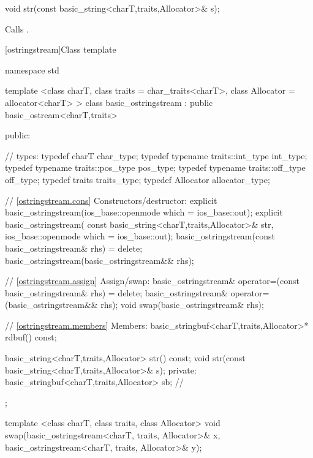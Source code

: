 %
%
\begin{itemdecl}
void str(const basic_string<charT,traits,Allocator>& s);
\end{itemdecl}

\begin{itemdescr}
\pnum
\effects
Calls
.
\end{itemdescr}

[ostringstream]{Class template }

%
\begin{codeblock}
namespace std {
  template <class charT, class traits = char_traits<charT>,
        class Allocator = allocator<charT> >
  class basic_ostringstream : public basic_ostream<charT,traits> {
  public:

    // types:
    typedef charT                     char_type;
    typedef typename traits::int_type int_type;
    typedef typename traits::pos_type pos_type;
    typedef typename traits::off_type off_type;
    typedef traits                    traits_type;
    typedef Allocator                 allocator_type;

    // \ref{ostringstream.cons} Constructors/destructor:
    explicit basic_ostringstream(ios_base::openmode which = ios_base::out);
    explicit basic_ostringstream(
             const basic_string<charT,traits,Allocator>& str,
             ios_base::openmode which = ios_base::out);
    basic_ostringstream(const basic_ostringstream& rhs) = delete;
    basic_ostringstream(basic_ostringstream&& rhs);

    // \ref{ostringstream.assign} Assign/swap:
    basic_ostringstream& operator=(const basic_ostringstream& rhs) = delete;
    basic_ostringstream& operator=(basic_ostringstream&& rhs);
    void swap(basic_ostringstream& rhs);

    // \ref{ostringstream.members} Members:
    basic_stringbuf<charT,traits,Allocator>* rdbuf() const;

    basic_string<charT,traits,Allocator> str() const;
    void    str(const basic_string<charT,traits,Allocator>& s);
   private:
    basic_stringbuf<charT,traits,Allocator> sb; // \exposr
  };

  template <class charT, class traits, class Allocator>
  void swap(basic_ostringstream<charT, traits, Allocator>& x,
            basic_ostringstream<charT, traits, Allocator>& y);
}
\end{codeblock}


